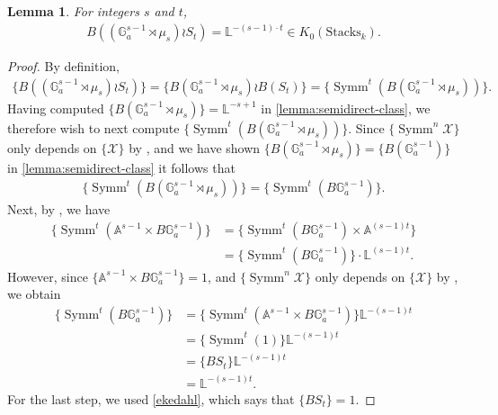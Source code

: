 \documentclass[12 pt]{amsart}
\theoremstyle{plain}
\newtheorem{lemma}[theorem]{Lemma}
\theoremstyle{definition}
\theoremstyle{remark}
\numberwithin{equation}{section}
\newcommand\ba{\mathbb A}
\newcommand\bg{\mathbb G}
\newcommand\bl{\mathbb L}
\newcommand\scx{\mathscr X}
\DeclareMathOperator\symm{Symm}
\newcommand\grStacks{K_0(\mathrm{Stacks}_k)} %
\begin{document}
\begin{lemma} \label{lemma:single-part-bh} For integers $s$ and $t$,
\begin{align*} B\left(\left( \bg_a^{s - 1} \rtimes \mu_{s} \right) \wr S_{t}
\right) = \bl^{-(s-1) \cdot t} \in \grStacks.  \end{align*} \end{lemma}
\begin{proof} 	By definition, \begin{align*} \{B(\left( \bg_a^{s - 1} \rtimes \mu_{s}
	\right) \wr S_{t})\} =  \{B\left( \bg_a^{s - 1} \rtimes \mu_{s} \right)
\wr B(S_{t}) \} = \{\symm^{t}(B\left( \bg_a^{s - 1} \rtimes \mu_{s} \right))\}.
\end{align*} Having computed $\{B\left( \bg_a^{s - 1} \rtimes \mu_{s} \right)\} =
\bl^{-s+1}$ in \autoref{lemma:semidirect-class}, we therefore wish to next
compute $\{\symm^{t}(B\left( \bg_a^{s - 1} \rtimes \mu_{s} \right))\}$.  Since
$\{\symm^n \scx\}$ only depends on $\{\scx\}$ by \cite[Prop.\
2.5]{ekedahlGeometricInvariantFinite2009}, and we have shown $\{B\left( \bg_a^{s
- 1} \rtimes \mu_{s} \right)\}= \{B(\bg_a^{s - 1})\}$ in
\autoref{lemma:semidirect-class} it follows that \begin{align*}
	\{\symm^{t}(B\left( \bg_a^{s - 1} \rtimes \mu_{s} \right))\} =
	\{\symm^{t}(B\bg_a^{s - 1})\}.  \end{align*} Next, by \cite[Lem.\
	2.4]{ekedahlGeometricInvariantFinite2009}, we have \begin{align*}
		\{\symm^{t}\left( \ba^{s-1} \times B \bg_a^{s-1} \right)\} &=
		\{\symm^{t}\left( B \bg_a^{s-1} \right) \times \ba^{(s-1)t}\} \\
	&= \{\symm^{t}\left( B \bg_a^{s-1} \right)\} \cdot \bl^{(s-1)t}.
\end{align*} However, since $\{\ba^{s-1} \times B \bg_a^{s-1} \} = 1$, and
$\{\symm^n \scx\}$ only depends on $\{\scx\}$ by \cite[Prop.\
2.5]{ekedahlGeometricInvariantFinite2009},
we obtain \begin{align*} \{\symm^{t}\left( B \bg_a^{s-1} \right)\} &=
	\{\symm^{t}\left( \ba^{s-1} \times B \bg_a^{s-1} \right)\} \bl^{-(s-1)t}
	\\ &= \{\symm^{t}\left( 1 \right)\} \bl^{-(s-1)t}  \\ &= \{BS_{t}\}
	\bl^{-(s-1)t} \\ &= \bl^{-(s-1)t}.  \end{align*} For the last step, we
	used \autoref{ekedahl}, which says that $\{BS_t\} = 1$.  
\end{proof}
\end{document}
